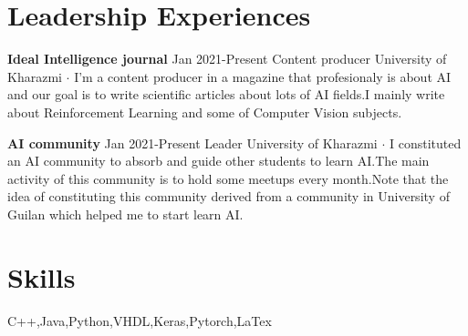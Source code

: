 \documentclass[paper=a4,fontsize=11pt]{scrartcl} %
\newcommand{\NewPart}[1]{\section*{{#1}}}
\begin{document}
\NewPart{Leadership Experiences}
{\textbf{Ideal Intelligence journal} \hfill \footnotesize Jan 2021-Present \newline
\footnotesize Content producer \hfill University of Kharazmi \newline
\footnotesize $\cdot$  I'm a content producer in a magazine that profesionaly is about AI and our goal is to write scientific articles about lots of AI fields.I mainly write about Reinforcement Learning and some of Computer Vision subjects.
}
\newline
\newline
{
\textbf{AI community} \hfill \footnotesize Jan 2021-Present\newline
\footnotesize Leader \hfill University of Kharazmi \newline
\footnotesize $\cdot$  I constituted an AI community to absorb and guide other students to learn AI.The main activity of this community is to hold some meetups every month.Note that the idea of constituting this community derived from a community in University of Guilan which helped me to start learn AI.

}

\NewPart{Skills}
C++,Java,Python,VHDL,Keras,Pytorch,LaTex
\end{document}
